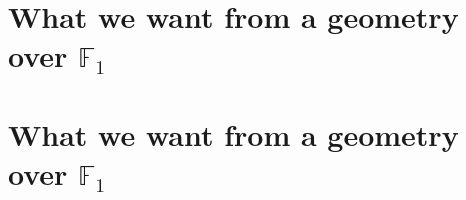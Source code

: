 \iftex
\section[What we want from a geometry over F\_1]{What we want from a geometry over $\mathbb{F}_1$}
\fi
\ifblog
\section{What we want from a geometry over $\mathbb{F}_1$}
\fi
